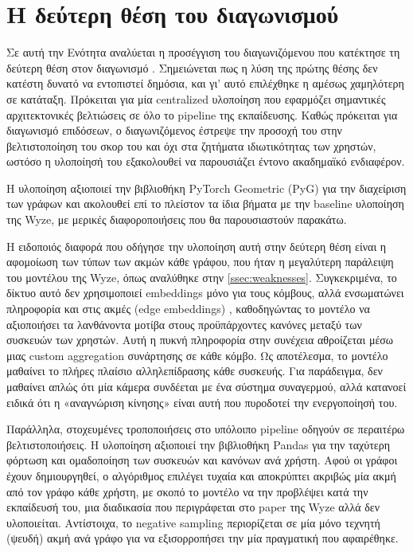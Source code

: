 \section{Η δεύτερη θέση του διαγωνισμού}\label{sec:second-place}
Σε αυτή την Ενότητα αναλύεται η προσέγγιση του διαγωνιζόμενου που κατέκτησε τη δεύτερη θέση στον διαγωνισμό \cite{conti_conti748wyze-rule-recommendation_2024}. Σημειώνεται πως η λύση της πρώτης θέσης δεν κατέστη δυνατό να εντοπιστεί δημόσια, και γι' αυτό επιλέχθηκε η αμέσως χαμηλότερη σε κατάταξη. Πρόκειται για μία centralized υλοποίηση που εφαρμόζει σημαντικές αρχιτεκτονικές βελτιώσεις σε όλο το pipeline της εκπαίδευσης. Καθώς πρόκειται για διαγωνισμό επιδόσεων, ο διαγωνιζόμενος έστρεψε την προσοχή του στην βελτιστοποίηση του σκορ του και όχι στα ζητήματα ιδιωτικότητας των χρηστών, ωστόσο η υλοποίησή του εξακολουθεί να παρουσιάζει έντονο ακαδημαϊκό ενδιαφέρον.

Η υλοποίηση αξιοποιεί την βιβλιοθήκη PyTorch Geometric (PyG) \cite{fey_fast_2019, pyg_software} για την διαχείριση των γράφων και ακολουθεί επί το πλείστον τα ίδια βήματα με την baseline υλοποίηση της Wyze, με μερικές διαφοροποιήσεις που θα παρουσιαστούν παρακάτω.

Η ειδοποιός διαφορά που οδήγησε την υλοποίηση αυτή στην δεύτερη θέση είναι η αφομοίωση των τύπων των ακμών κάθε γράφου, που ήταν η μεγαλύτερη παράλειψη του μοντέλου της Wyze, όπως αναλύθηκε στην \autoref{ssec:weaknesses}. Συγκεκριμένα, το δίκτυο αυτό δεν χρησιμοποιεί embeddings μόνο για τους κόμβους, αλλά ενσωματώνει πληροφορία και στις ακμές (edge embeddings) \cite{schlichtkrull_modeling_2018}, καθοδηγώντας το μοντέλο να αξιοποιήσει τα λανθάνοντα μοτίβα στους προϋπάρχοντες κανόνες μεταξύ των συσκευών των χρηστών. Αυτή η πυκνή πληροφορία στην συνέχεια αθροίζεται μέσω μιας custom aggregation συνάρτησης σε κάθε κόμβο. Ως αποτέλεσμα, το μοντέλο μαθαίνει το πλήρες πλαίσιο αλληλεπίδρασης κάθε συσκευής. Για παράδειγμα, δεν μαθαίνει απλώς ότι μία κάμερα συνδέεται με ένα σύστημα συναγερμού, αλλά κατανοεί ειδικά ότι η «αναγνώριση κίνησης» είναι αυτή που πυροδοτεί την ενεργοποίησή του.

Παράλληλα, στοχευμένες τροποποιήσεις στο υπόλοιπο pipeline οδηγούν σε περαιτέρω βελτιστοποιήσεις. Η υλοποίηση αξιοποιεί την βιβλιοθήκη Pandas \cite{mckinney_data_2010, pandas_software} για την ταχύτερη φόρτωση και ομαδοποίηση των συσκευών και κανόνων ανά χρήστη. Αφού οι γράφοι έχουν δημιουργηθεί, ο αλγόριθμος επιλέγει τυχαία και αποκρύπτει ακριβώς μία ακμή από τον γράφο κάθε χρήστη, με σκοπό το μοντέλο να την προβλέψει κατά την εκπαίδευσή του, μια διαδικασία που περιγράφεται στο paper της Wyze αλλά δεν υλοποιείται. Αντίστοιχα, το negative sampling περιορίζεται σε μία μόνο τεχνητή (ψευδή) ακμή ανά γράφο για να εξισορροπήσει την μία πραγματική που αφαιρέθηκε.

